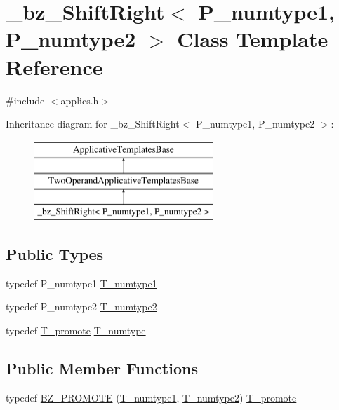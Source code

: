 \hypertarget{class__bz__ShiftRight}{}\section{\+\_\+bz\+\_\+\+Shift\+Right$<$ P\+\_\+numtype1, P\+\_\+numtype2 $>$ Class Template Reference}
\label{class__bz__ShiftRight}


{\ttfamily \#include $<$applics.\+h$>$}

Inheritance diagram for \+\_\+bz\+\_\+\+Shift\+Right$<$ P\+\_\+numtype1, P\+\_\+numtype2 $>$\+:\begin{figure}[H]
\begin{center}
\leavevmode
\includegraphics[height=3.000000cm]{class__bz__ShiftRight}
\end{center}
\end{figure}
\subsection*{Public Types}
\begin{DoxyCompactItemize}
\item 
typedef P\+\_\+numtype1 \hyperlink{class__bz__ShiftRight_adf5a9911b34694358a171784582d3a97}{T\+\_\+numtype1}
\item 
typedef P\+\_\+numtype2 \hyperlink{class__bz__ShiftRight_a6904d816d9b83ddae1d8ec931b8ad3da}{T\+\_\+numtype2}
\item 
typedef \hyperlink{minmax_8h_aaa88a440c2f0d00798d5b1d42c79308d}{T\+\_\+promote} \hyperlink{class__bz__ShiftRight_ac5280f5b1510725bbf85505943565733}{T\+\_\+numtype}
\end{DoxyCompactItemize}
\subsection*{Public Member Functions}
\begin{DoxyCompactItemize}
\item 
typedef \hyperlink{class__bz__ShiftRight_aee3bd0fb6bc36ea8ff0ab53064bb1123}{B\+Z\+\_\+\+P\+R\+O\+M\+O\+T\+E} (\hyperlink{class__bz__ShiftRight_adf5a9911b34694358a171784582d3a97}{T\+\_\+numtype1}, \hyperlink{class__bz__ShiftRight_a6904d816d9b83ddae1d8ec931b8ad3da}{T\+\_\+numtype2}) \hyperlink{minmax_8h_aaa88a440c2f0d00798d5b1d42c79308d}{T\+\_\+promote}
\end{DoxyCompactItemize}
